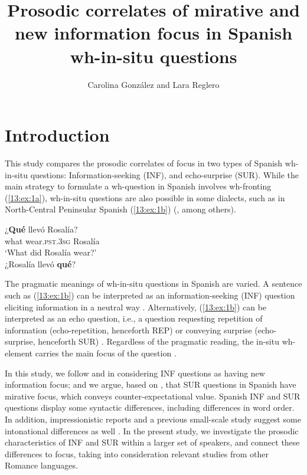 \documentclass[output=paper,colorlinks,citecolor=brown,draftmode]{langscibook}
\author{Carolina González\affiliation{Florida State University} and Lara Reglero\affiliation{Florida State University}}
\title{Prosodic correlates of mirative and new information focus in Spanish wh-in-situ questions}
\begin{document}
\maketitle

\section{Introduction}\label{sec:13:1}
This study compares the prosodic correlates of focus in two types of Spanish wh-in-situ questions: Information-seeking (INF), and echo-surprise (SUR). While the main strategy to formulate a wh-question in Spanish involves wh-fronting (\ref{13:ex:1a}), wh-in-situ questions are also possible in some dialects, such as in North-Central Peninsular Spanish (\ref{13:ex:1b}) (\citealp{Jiménez1997,Uribe-Etxebarria2002,EtxepareUribe-Etxebarria2005,Reglero2007,RegleroTicio2013}, among others).

\ea \label{13:ex:1}
\ea \gll \label{13:ex:1a}¿\textbf{Qué}  llevó               Rosalía?\\
what  wear.\textsc{pst}.3\textsc{sg} Rosalía\\
\glt ‘What did Rosalía wear?’\\
\ex \label{13:ex:1b}
¿Rosalía llevó \textbf{qué}?
\z
\z

The pragmatic meanings of wh-in-situ questions in Spanish are varied. A sentence such as (\ref{13:ex:1b}) can be interpreted as an information-seeking (INF) question eliciting information in a neutral way \citep{Reglero2007, RegleroTicio2013}. Alternatively, (\ref{13:ex:1b}) can be interpreted as an echo question, i.e., a question requesting repetition of information (echo-repetition, henceforth REP) or conveying surprise (echo-surprise, henceforth SUR) \citep{Chernova2013, Chernova2017, RegleroTicio2013}. Regardless of the pragmatic reading, the in-situ wh-element carries the main focus of the question \citep{Horvath1986, Rochemont1986, Tuller1992, Zubizarreta1998,escandellvidal1999}.

In this study, we follow \citet{Reglero2007} and \citet{RegleroTicio2013} in considering INF questions as having new information focus; and we argue, based on \citet{BadanCrocco2019}, that SUR questions in Spanish have mirative focus, which conveys counter-expectational value. Spanish INF and SUR questions display some syntactic differences, including differences in word order. In addition, impressionistic reports and a previous small-scale study suggest some intonational differences as well \citep{gonzalez2018dime}. In the present study, we investigate the prosodic characteristics of INF and SUR within a larger set of speakers, and connect these differences to focus, taking into consideration relevant studies from other Romance languages.
\end{document}
